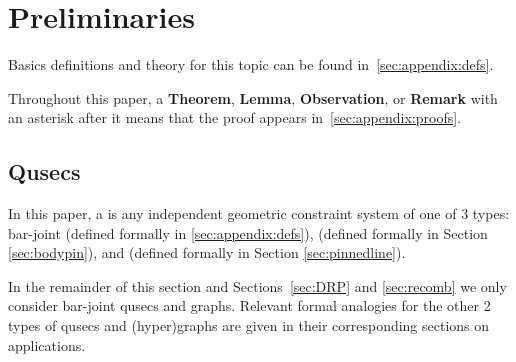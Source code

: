 \section{Preliminaries}
\label{sec:prelim}

Basics definitions and theory for this topic can be found in~\ref{sec:appendix:defs}.

Throughout this paper, a \textbf{\textsf{Theorem}}, \textbf{\textsf{Lemma}}, \textbf{\textsf{Observation}}, or \textbf{\textsf{Remark}} with an asterisk after it means that the proof appears in~\ref{sec:appendix:proofs}.


\subsection{Qusecs}


In this paper, a  is any independent geometric constraint system of one of 3 types: bar-joint (defined formally in \ref{sec:appendix:defs}),  (defined formally in Section \ref{sec:bodypin}), and  (defined formally in Section \ref{sec:pinnedline}).


In the remainder of this section and Sections~\ref{sec:DRP} and \ref{sec:recomb} we only consider bar-joint qusecs and graphs. Relevant formal analogies for the other 2 types of qusecs and (hyper)graphs are given in their corresponding sections on applications.






